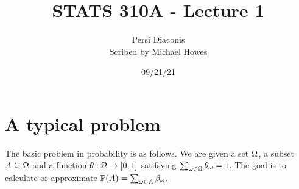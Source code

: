 


\title{STATS 310A - Lecture 1}
\author{Persi Diaconis\\ Scribed by Michael Howes}
\date{09/21/21}

\pagestyle{fancy}
\fancyhf{}

\maketitle
\tableofcontents
\section{A typical problem}
The basic problem in probability is as follows. We are given a set ${{\Omega}}$, a subset $A \subseteq {{\Omega}}$ and a function $\theta : {{\Omega}} \to [0,1]$ satifsying $\sum_{\omega \in {{\Omega}}}\theta_\omega = 1$. The goal is to calculate or approximate ${\mathbb{P}}(A) = \sum_{{\omega} \in A} \beta_{\omega}$. 

